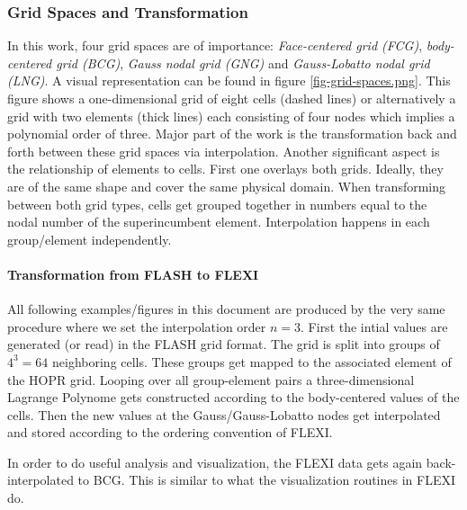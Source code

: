 \subsubsection{Grid Spaces and Transformation}

In this work, four grid spaces are of importance: \emph{Face-centered grid
(FCG)}, \emph{body-centered grid (BCG)}, \emph{Gauss nodal grid (GNG)} and
\emph{Gauss-Lobatto nodal grid (LNG)}. A visual representation can be found in
figure \ref{fig-grid-spaces.png}. This figure shows a one-dimensional grid of
eight cells (dashed lines) or alternatively a grid with two elements (thick
lines) each consisting of four nodes which implies a polynomial order of three.
Major part of the work is the transformation back and forth between these
grid spaces via interpolation. Another significant aspect is the relationship
of elements to cells. First one overlays both grids. Ideally, they are of the
same shape and cover the same physical domain. When transforming between both
grid types, cells get grouped together in numbers equal to the nodal number of
the superincumbent element. Interpolation happens in each group/element
independently.


\paragraph{Transformation from \textsc{FLASH} to \textsc{FLEXI}}

All following examples/figures in this document are produced by the very same
procedure where we set the interpolation order $n = 3$. First the intial values
are generated (or read) in the FLASH grid format. The grid is split into groups
of $4^3 = 64$ neighboring cells. These groups get mapped to the associated
element of the HOPR grid. Looping over all group-element pairs a
three-dimensional Lagrange Polynome gets constructed according to the
body-centered values of the cells. Then the new values at the
Gauss/Gauss-Lobatto nodes get interpolated and stored according to the ordering
convention of FLEXI.

In order to do useful analysis and visualization, the FLEXI data gets again
back-interpolated to BCG. This is similar to what the visualization routines in
FLEXI do.

